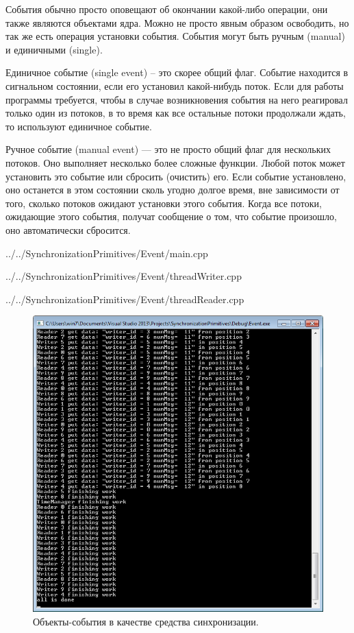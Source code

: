 \documentclass[a4paper, 12pt]{article}		%
\begin{document}
События обычно просто оповещают об окончании какой-либо операции, они также являются объектами ядра. Можно не просто явным образом освободить, но так же есть операция установки события. События могут быть ручным (manual) и единичными (single).

Единичное событие (single event) – это скорее общий флаг. Событие находится в сигнальном состоянии, если его установил какой-нибудь поток. Если для работы программы требуется, чтобы в случае возникновения события на него реагировал только один из потоков, в то время как все остальные потоки продолжали ждать, то используют единичное событие.

Ручное событие (manual event) — это не просто общий флаг для нескольких потоков. Оно выполняет несколько более сложные функции. Любой поток может установить это событие или сбросить (очистить) его. Если событие установлено, оно останется в этом состоянии сколь угодно долгое время, вне зависимости от того, сколько потоков ожидают установки этого события. Когда все потоки, ожидающие этого события, получат сообщение о том, что событие произошло, оно автоматически сбросится.


{../../SynchronizationPrimitives/Event/main.cpp}


{../../SynchronizationPrimitives/Event/threadWriter.cpp}


{../../SynchronizationPrimitives/Event/threadReader.cpp}


\begin{figure}[h!]
\centering
\includegraphics[scale=1]{res/004}
\caption{Объекты-события в качестве средства синхронизации.}
\end{figure}
\end{document}
